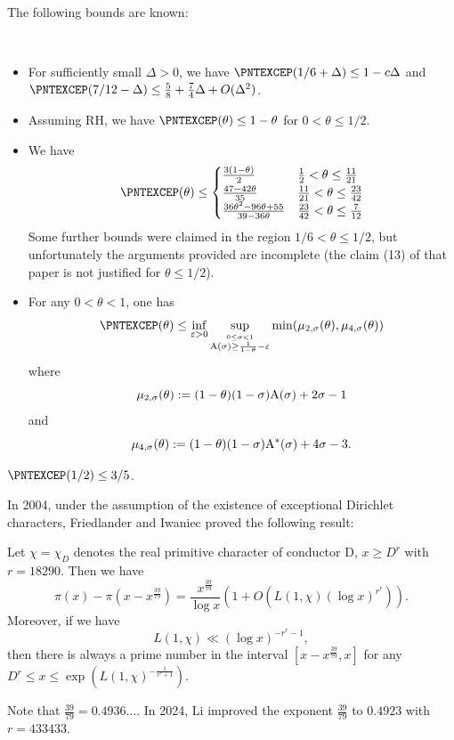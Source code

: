 The following bounds are known:

\begin{lemma}[Bounds on $\mu$]\label{baz-bound}\
  \begin{itemize}
  \item[(i)]  \cite[Theorem 2(i)]{bazzanella-perelli}  For sufficiently small $\Delta>0$, we have $\PNTEXCEP(1/6 + \Delta) \leq 1 - c\Delta$ and $\PNTEXCEP(7/12-\Delta) \leq \frac{5}{8} + \frac{7}{4}\Delta + O(\Delta^2)$.
  \item[(ii)] \cite[Theorem 2(ii)]{bazzanella-perelli} Assuming RH, we have $\PNTEXCEP(\theta) \leq 1-\theta$ for $0 < \theta \leq 1/2$.
    \item[(iii)] \cite[Lemma 1]{bazzanella} We have
  $$
  \PNTEXCEP(\theta) \leq
  \begin{cases}
  \frac{3(1-\theta)}{2} & \frac{1}{2} < \theta \leq \frac{11}{21} \\
  \frac{47-42\theta}{35}& \frac{11}{21} < \theta \leq \frac{23}{42} \\
  \frac{36\theta^2-96\theta+55}{39-36\theta} & \frac{23}{42} < \theta \leq \frac{7}{12} \\
  \end{cases}
  $$
  Some further bounds were claimed in the region $1/6 < \theta \leq 1/2$, but unfortunately the arguments provided are incomplete (the claim (13) of that paper is not justified for $\theta \leq 1/2$).
  \item[(iv)] \cite{gafni-tao} For any $0 < \theta < 1$, one has
$$\PNTEXCEP(\theta) \leq \inf_{\eps>0} \sup_{\stackrel{0 \leq \sigma < 1}{\A(\sigma) \geq \frac{1}{1-\theta}-\eps}} \min(\mu_{2,\sigma}(\theta), \mu_{4,\sigma}(\theta))$$
where
$$ \mu_{2,\sigma}(\theta) := (1-\theta)(1-\sigma) \mathrm{A}(\sigma) + 2\sigma - 1$$
and
$$ \mu_{4,\sigma}(\theta) := (1-\theta)(1-\sigma) \mathrm{A}^*(\sigma) + 4\sigma-3.$$
  \end{itemize}
  \item[(v)] \cite[Theorem 2]{heath-brown_differences_2021} $\PNTEXCEP(1/2) \leq 3/5$.
\end{lemma}


In 2004, under the assumption of the existence of exceptional Dirichlet characters, Friedlander and Iwaniec \cite{FI2004} proved the following result:
\begin{theorem}\cite{FI2004}
Let $\chi=\chi_{D}$ denotes the real primitive character of conductor D, $x \geqslant D^{r}$ with $r=18290$. Then we have
$$
\pi(x) - \pi\left(x-x^{\frac{39}{79}}\right) = \frac{x^{\frac{39}{79}}}{\log x} \left(1 + O\left(L(1, \chi)(\log x)^{r^{r}}\right)\right).
$$
Moreover, if we have
$$
L(1, \chi) \ll (\log x)^{-r^{r}-1},
$$
then there is always a prime number in the interval $\left[x - x^{\frac{39}{79}}, x \right]$ for any $D^{r} \leqslant x \leqslant \exp\left(L(1, \chi)^{- \frac{1}{r^r + 1} } \right)$.
\end{theorem}
Note that $\frac{39}{79} = 0.4936 \dots$. In 2024, Li \cite{li_hybrid_2024} improved the exponent $\frac{39}{79}$ to $0.4923$ with $r=433433$.

